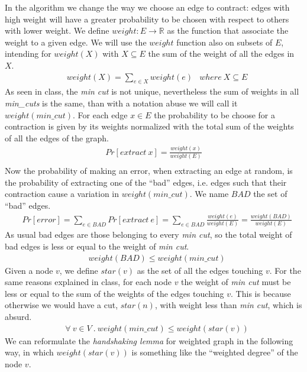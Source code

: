 \documentclass[a4paper]{article}
\begin{document}
In the algorithm we change the way we choose an edge to contract: edges with high weight will have a greater probability to be chosen with respect to others with lower weight.
We define $weight: E \longrightarrow \mathbb{R}$ as the function that associate the weight to a given edge.
We will use the $weight$ function also on subsets of $E$, intending for $weight(X)$ with $X \subseteq E$ the sum of the weight of all the edges in $X$.
\begin{align*}
&weight(X) = \sum_{e \in X} weight(e) &where\ X \subseteq E
\end{align*}
As seen in class, the \textit{min cut} is not unique, nevertheless the sum of weights in all \textit{min\_cuts} is the same, than with a notation abuse we will call it $weight(min\_cut)$.
For each edge $x \in E$ the probability to be choose for a contraction is given by its weights normalized with the total sum of the weights of all the edges of the graph.
\begin{align*}
Pr[extract\ x] = \frac{weight(x)}{weight(E)}\\
\end{align*}
Now the probability of making an error, when extracting an edge at random, is the probability of extracting one of the ``bad'' edges, i.e. edges such that their contraction cause a variation in $weight(min\_cut)$.
We name $BAD$ the set of ``bad'' edges.
\begin{align*}
&Pr[error] = \sum_{e \in BAD} Pr[extract\ e] = \sum_{e \in BAD} \frac{weight(e)}{weight(E)} = \frac{weight(BAD)}{weight(E)} \tag{1}
\end{align*}
As usual bad edges are those belonging to every \textit{min cut}, so the total weight of bad edges is less or equal to the weight of \textit{min cut}.
\begin{align*}
&weight(BAD) \leq {weight(min\_cut)} \tag{2}
\end{align*}
Given a node $v$, we define $star(v)$ as the set of all the edges touching $v$.
For the same reasons explained in class, for each node $v$ the weight of \textit{min cut} must be less or equal to the sum of the weights of the edges touching $v$.
This is because otherwise we would have a cut, $star(n)$, with weight less than \textit{min cut}, which is absurd.
\begin{align*}
&\forall\ v \in V\ .\ weight(min\_cut) \leq weight(star(v)) \tag{3}
\end{align*}
We can reformulate the \textit{handshaking lemma} for weighted graph in the following way, in which $weight(star(v))$ is something like the ``weighted degree'' of the node $v$.
\end{document}
